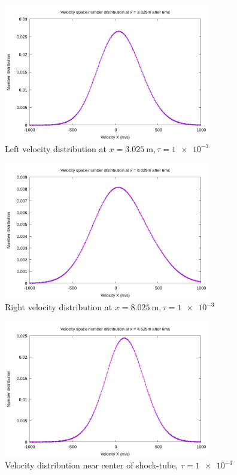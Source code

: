 \documentclass[paper=a4, fontsize=12pt]{scrartcl}
\begin{document}
\begin{figure}[H]
        \centering
        \includegraphics[width=0.8\textwidth]{left_f}
        \caption{Left velocity distribution at $x = \SI{3.025}{\meter}, \tau = \SI{1e-3}{}$ }
        \label{fig:left_f}
\end{figure}
\begin{figure}[H]
        \centering
        \includegraphics[width=0.8\textwidth]{right_f}
        \caption{Right velocity distribution at $x = \SI{8.025}{\meter}, \tau = \SI{1e-3}{}$ }
        \label{fig:right_f}
\end{figure}
\begin{figure}[H]
        \centering
        \includegraphics[width=0.8\textwidth]{center_shock}
        \caption{Velocity distribution near center of shock-tube, $\tau = \SI{1e-3}{}$}
        \label{fig:center_shock}
\end{figure}
\end{document}

